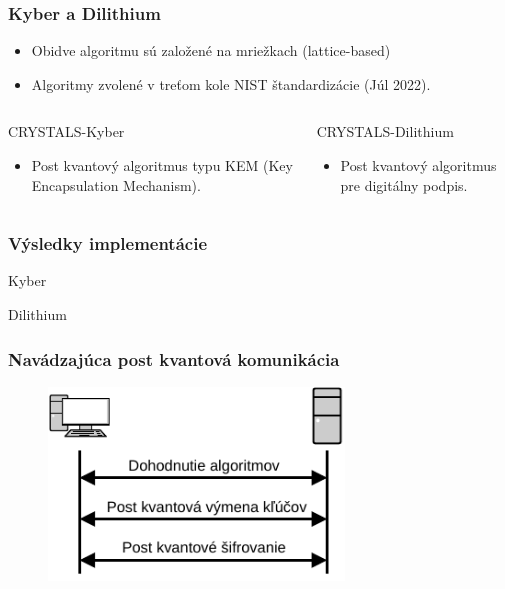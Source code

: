 \documentclass[%
  14pt,       				%
	t,                  %
	aspectratio=1610,   %
	unicode,						%
]{beamer}				    	%
\begin{document}
\begin{frame} 
	\frametitle{Kyber a Dilithium}
	\begin{itemize}
		\item Obidve algoritmu sú založené na mriežkach (lattice-based)
		\item Algoritmy zvolené v treťom kole NIST štandardizácie (Júl 2022).
	\end{itemize}
	\vspace{3ex}
	\begin{columns}[T]
		\begin{column}{0.5\textwidth}
			CRYSTALS-Kyber
			\begin{itemize}
				\item Post kvantový algoritmus typu KEM (Key Encapsulation Mechanism).
			\end{itemize}
		\end{column}
		\begin{column}{0.5\textwidth}
			CRYSTALS-Dilithium
			\begin{itemize}
				\item Post kvantový algoritmus pre digitálny podpis.
			\end{itemize}
		\end{column}
	\end{columns}
	
\end{frame}


\begin{frame}
	\frametitle{Výsledky implementácie}
	
	\begin{table}[htbp]
		\centering
		
		\caption{Kyber}
	\end{table}
	\begin{table}[htbp]
		\centering
		
		\caption{Dilithium}
	\end{table}
\end{frame}

\begin{frame} 
	\frametitle{Navádzajúca post kvantová komunikácia}
	\begin{figure}[htbp]
		\centering
		\includegraphics[width=0.7\textwidth]{pictures/future.pdf}
	\end{figure}
\end{frame}
\end{document}
